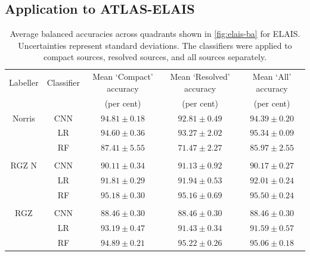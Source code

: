 \documentclass[fleqn,usenatbib,usedcolumn]{mnras}
\begin{document}
\subsection{Application to ATLAS-ELAIS}
\label{sec:elais}
\begin{table}
\caption{Average balanced accuracies across quadrants shown in \autoref{fig:elais-ba} for ELAIS.
      Uncertainties represent standard deviations.
      The classifiers were applied to compact sources, resolved sources, and all
      sources separately.}
    \label{ba:average-accuracies-elais}
\begin{tabular}{ccccc}
\hline
Labeller & Classifier & Mean `Compact' accuracy & Mean `Resolved' accuracy & Mean `All' accuracy \\
 & & (per cent) & (per cent) & (per cent)\\
\hline
Norris & CNN & $94.81 \pm 0.18$ & $92.81 \pm 0.49$ & $94.39 \pm 0.20$ \\
 & LR & $94.60 \pm 0.36$ & $93.27 \pm 2.02$ & $95.34 \pm 0.09$ \\
 & RF & $87.41 \pm 5.55$ & $71.47 \pm 2.27$ & $85.97 \pm 2.55$ \\
 \\
RGZ N & CNN & $90.11 \pm 0.34$ & $91.13 \pm 0.92$ & $90.17 \pm 0.27$ \\
 & LR & $91.81 \pm 0.29$ & $91.94 \pm 0.53$ & $92.01 \pm 0.24$ \\
 & RF & $95.18 \pm 0.30$ & $95.16 \pm 0.69$ & $95.50 \pm 0.24$ \\
 \\
RGZ & CNN & $88.46 \pm 0.30$ & $88.46 \pm 0.30$ & $88.46 \pm 0.30$ \\
 & LR & $93.19 \pm 0.47$ & $91.43 \pm 0.34$ & $91.59 \pm 0.57$ \\
 & RF & $94.89 \pm 0.21$ & $95.22 \pm 0.26$ & $95.06 \pm 0.18$ \\
 \hline
\end{tabular}
\end{table}
\end{document}
